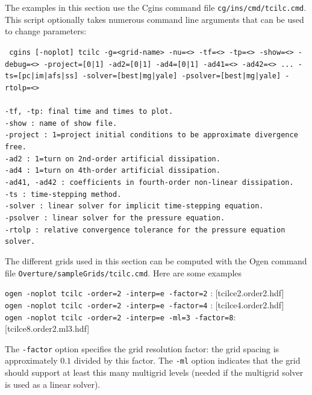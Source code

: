 \documentclass{article}
\begin{document}
The examples in this section use the Cgins command file {\tt cg/ins/cmd/tcilc.cmd}.
This script optionally takes numerous command line arguments that can be used to change parameters: 
\begin{flushleft}\tt
 cgins [-noplot] tcilc -g=<grid-name> -nu=<> -tf=<> -tp=<> -show=<> -debug=<> -project=[0|1] -ad2=[0|1] -ad4=[0|1] -ad41=<> -ad42=<> ... 
         -ts=[pc|im|afs|ss] -solver=[best|mg|yale] -psolver=[best|mg|yale] -rtolp=<>  \\
~~ \\
\quad -tf, -tp: final time and times to plot. \\
\quad -show : name of show file. \\
\quad -project : 1=project initial conditions to be approximate divergence free. \\
\quad -ad2 : 1=turn on 2nd-order artificial dissipation. \\
\quad -ad4 : 1=turn on 4th-order artificial dissipation. \\
\quad -ad41, -ad42 : coefficients in fourth-order non-linear dissipation. \\
\quad -ts : time-stepping method. \\
\quad -solver : linear solver for implicit time-stepping equation. \\
\quad -psolver : linear solver for the pressure equation. \\
\quad -rtolp : relative convergence tolerance for the pressure equation solver.
\end{flushleft} 


The different grids used in this section can be computed with the Ogen command
file {\tt Overture/sampleGrids/tcilc.cmd}. Here are some examples 
\begin{flushleft}
  {\tt ogen -noplot tcilc -order=2 -interp=e -factor=2} : [tcilce2.order2.hdf] \\
  {\tt ogen -noplot tcilc -order=2 -interp=e -factor=4} : [tcilce4.order2.hdf] \\
  {\tt ogen -noplot tcilc -order=2 -interp=e -ml=3 -factor=8}: [tcilce8.order2.ml3.hdf]
\end{flushleft}
The {\tt -factor} option specifies the grid resolution factor: the grid spacing is approximately 
$0.1$ divided by this factor. 
The {\tt -ml} option indicates that the grid should support at least this many multigrid
levels (needed if the multigrid solver is used as a linear solver).
\end{document}
